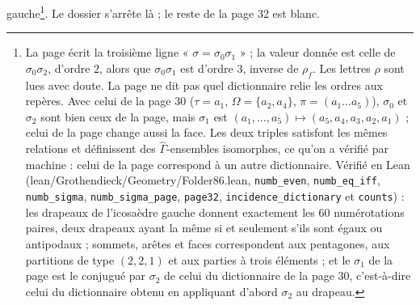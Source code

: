 \documentclass[11pt,a4paper]{article}
\begin{document}
gauche\footnote{La page écrit la troisième ligne « $\sigma = \sigma_0\sigma_1$ »
; la valeur donnée est celle de $\sigma_0\sigma_2$, d'ordre $2$, alors que
$\sigma_0\sigma_1$ est d'ordre $3$, inverse de $\rho_f$. Les lettres $\rho$ sont
lues avec doute. La page ne dit pas quel dictionnaire relie les ordres aux
repères. Avec celui de la page 30 ($\tau = a_1$, $\Omega = \{a_2, a_4\}$,
$\pi = (a_1 \ldots a_5)$), $\sigma_0$ et $\sigma_2$ sont bien ceux de la page,
mais $\sigma_1$ est $(a_1, \ldots, a_5) \mapsto (a_5, a_4, a_3, a_2, a_1)$ ;
celui de la page change aussi la face. Les deux triples satisfont les mêmes
relations et définissent des $\widehat{\Gamma}$-ensembles isomorphes, ce qu'on
a vérifié par machine : celui de la page correspond à un autre dictionnaire.
Vérifié en Lean (lean/Grothendieck/Geometry/Folder86.lean, \texttt{numb\_even},
\texttt{numb\_eq\_iff}, \texttt{numb\_sigma}, \texttt{numb\_sigma\_page},
\texttt{page32}, \texttt{incidence\_dictionary} et \texttt{counts}) : les
drapeaux de l'icosaèdre gauche donnent exactement les $60$ numérotations
paires, deux drapeaux ayant la même si et seulement s'ils sont égaux ou
antipodaux ; sommets, arêtes et faces correspondent aux pentagones, aux
partitions de type $(2,2,1)$ et aux parties à trois éléments ; et le
$\sigma_1$ de la page est le conjugué par $\sigma_2$ de celui du dictionnaire
de la page 30, c'est-à-dire celui du dictionnaire obtenu en appliquant
d'abord $\sigma_2$ au drapeau.}.
Le dossier s'arrête là ; le reste de la page 32 est blanc.
\end{document}
